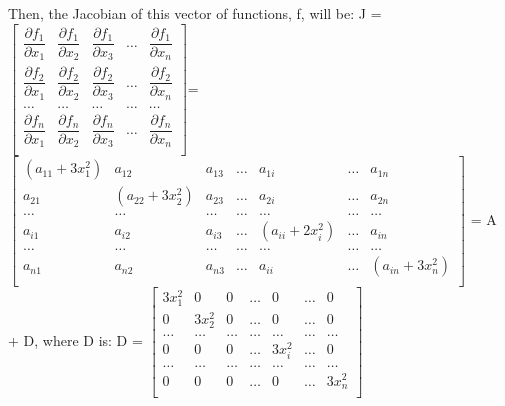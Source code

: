 \documentclass{article}
\begin{document}
Then, the Jacobian of this vector of functions, f, will be: \newline
J = $\begin{bmatrix}
	\dfrac{\partial f_1}{\partial x_1} & \dfrac{\partial f_1}{\partial x_2} & \dfrac{\partial f_1}{\partial x_3} & \dots & \dfrac{\partial f_1}{\partial x_n}\\
	\dfrac{\partial f_2}{\partial x_1} & \dfrac{\partial f_2}{\partial x_2} & \dfrac{\partial f_2}{\partial x_3} & \dots & \dfrac{\partial f_2}{\partial x_n}\\
	\dots & \dots & \dots & \dots & \dots \\
	\dfrac{\partial f_n}{\partial x_1} & \dfrac{\partial f_n}{\partial x_2} & \dfrac{\partial f_n}{\partial x_3} & \dots & \dfrac{\partial f_n}{\partial x_n}\\
\end{bmatrix}$\newline \newline = $\begin{bmatrix}
		(a_{11} + 3x_1^2) & a_{12} & a_{13} & \dots & a_{1i} & \dots & a_{1n} \\
		a_{21} & (a_{22} + 3x_2^2) & a_{23} & \dots & a_{2i} & \dots & a_{2n} \\
		\dots & \dots & \dots & \dots & \dots & \dots & \dots \\
		a_{i1} & a_{i2} & a_{i3} & \dots & (a_{ii} + 2x_i^2) & \dots & a_{in} \\
		\dots & \dots & \dots & \dots & \dots & \dots & \dots \\
		a_{n1} & a_{n2} & a_{n3} & \dots & a_{ii} & \dots & (a_{in} + 3x_n^2) \\
		 \end{bmatrix}$ = A + D, where D is: \newline \newline
		 D = $\begin{bmatrix}
			 3x_1^2 & 0 & 0 & \dots & 0 & \dots & 0 \\
			 0 & 3x_2^2 & 0 & \dots & 0 & \dots & 0 \\
			\dots & \dots & \dots & \dots & \dots & \dots & \dots \\
			 0 & 0 & 0 & \dots & 3x_i^2 & \dots & 0 \\
			\dots & \dots & \dots & \dots & \dots & \dots & \dots \\
			 0 & 0 & 0 & \dots & 0 & \dots & 3x_n^2 \\
		      \end{bmatrix}$ \newline
\end{document}
